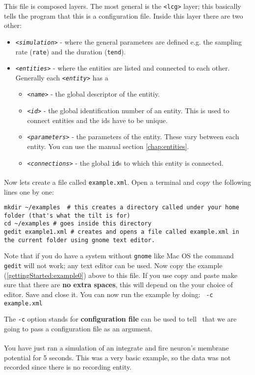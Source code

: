 This file is composed layers. The most general is the \texttt{<lcg>} layer; this basically tells the program that this is a configuration file. Inside this layer there are two other:
\begin{itemize}
\item
\emph{ \texttt{<simulation>}} - where the general parameters are defined e.g. the sampling rate (\texttt{rate}) and the duration (\texttt{tend}).

\item
\emph{ \texttt{<entities>}}  - where the entities are listed and connected to each other. Generally each \emph{ \texttt{<entity>}} has a 
	\begin{itemize}
	\item \emph{ \texttt{<name>}} - the global descriptor of the entitiy. 
	\item \emph{ \texttt{<id>}} - the global identification number of an entity. This is used to connect entities and the ids have to be unique.
	\item \emph{ \texttt{<parameters>}} - the parameters of the entity. These vary between each entity. You can use the manual section \ref{chap:entities}.
	\item \emph{ \texttt{<connections>}} - the global \texttt{id}s to which this entity is connected.
	\end{itemize}
\end{itemize}

\paragraph{}
Now lets create a file called \texttt{example.xml}. Open a terminal and copy the following lines one by one:

\begin{lstlisting}[escapeinside=\{\}]
mkdir ~/examples  # this creates a directory called under your home folder (that's what the tilt is for)
cd ~/examples # goes inside this directory
gedit example1.xml # creates and opens a file called example.xml in the current folder using gnome text editor.
\end{lstlisting}

Note that if you do have a system without \texttt{gnome} like Mac OS the command \texttt{gedit} will not work; any text editor can be used. Now copy the example (\ref{gettingStarted:example0}) above to this file. If you use copy and paste make sure that there are \textbf{no extra spaces}, this will depend on the your choice of editor. Save and close it. You can now run the example by doing: \texttt{\progname\ -c example.xml}

The \texttt{-c} option stands for \textbf{configuration file} can be used to tell \progname\ that we are going to pass a configuration file as an argument.

\paragraph{} You have just ran a simulation of an integrate and fire neuron's membrane potential for 5 seconds. This was a very basic example, so the data was not recorded since there is no recording entity. 